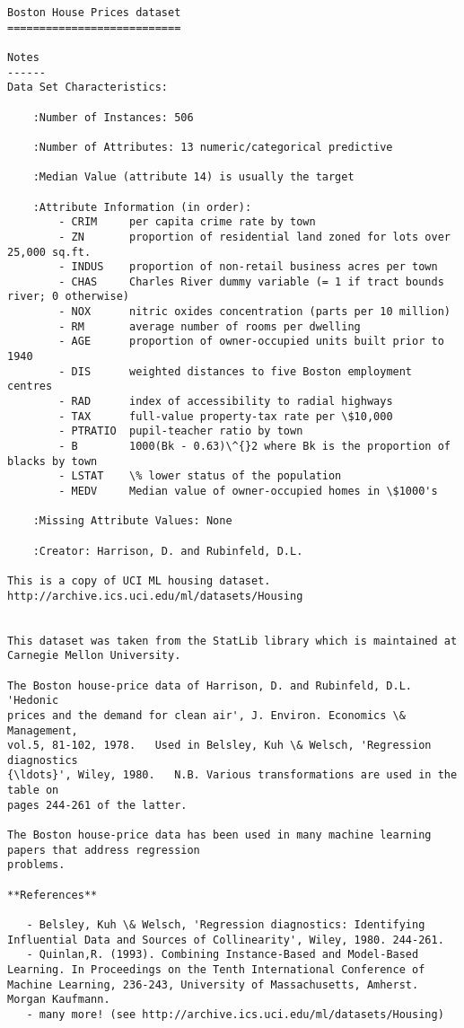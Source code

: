 \documentclass[11pt]{article}
\begin{document}
    \begin{Verbatim}[commandchars=\\\{\}]
Boston House Prices dataset
===========================

Notes
------
Data Set Characteristics:  

    :Number of Instances: 506 

    :Number of Attributes: 13 numeric/categorical predictive
    
    :Median Value (attribute 14) is usually the target

    :Attribute Information (in order):
        - CRIM     per capita crime rate by town
        - ZN       proportion of residential land zoned for lots over 25,000 sq.ft.
        - INDUS    proportion of non-retail business acres per town
        - CHAS     Charles River dummy variable (= 1 if tract bounds river; 0 otherwise)
        - NOX      nitric oxides concentration (parts per 10 million)
        - RM       average number of rooms per dwelling
        - AGE      proportion of owner-occupied units built prior to 1940
        - DIS      weighted distances to five Boston employment centres
        - RAD      index of accessibility to radial highways
        - TAX      full-value property-tax rate per \$10,000
        - PTRATIO  pupil-teacher ratio by town
        - B        1000(Bk - 0.63)\^{}2 where Bk is the proportion of blacks by town
        - LSTAT    \% lower status of the population
        - MEDV     Median value of owner-occupied homes in \$1000's

    :Missing Attribute Values: None

    :Creator: Harrison, D. and Rubinfeld, D.L.

This is a copy of UCI ML housing dataset.
http://archive.ics.uci.edu/ml/datasets/Housing


This dataset was taken from the StatLib library which is maintained at Carnegie Mellon University.

The Boston house-price data of Harrison, D. and Rubinfeld, D.L. 'Hedonic
prices and the demand for clean air', J. Environ. Economics \& Management,
vol.5, 81-102, 1978.   Used in Belsley, Kuh \& Welsch, 'Regression diagnostics
{\ldots}', Wiley, 1980.   N.B. Various transformations are used in the table on
pages 244-261 of the latter.

The Boston house-price data has been used in many machine learning papers that address regression
problems.   
     
**References**

   - Belsley, Kuh \& Welsch, 'Regression diagnostics: Identifying Influential Data and Sources of Collinearity', Wiley, 1980. 244-261.
   - Quinlan,R. (1993). Combining Instance-Based and Model-Based Learning. In Proceedings on the Tenth International Conference of Machine Learning, 236-243, University of Massachusetts, Amherst. Morgan Kaufmann.
   - many more! (see http://archive.ics.uci.edu/ml/datasets/Housing)


    \end{Verbatim}
\end{document}

